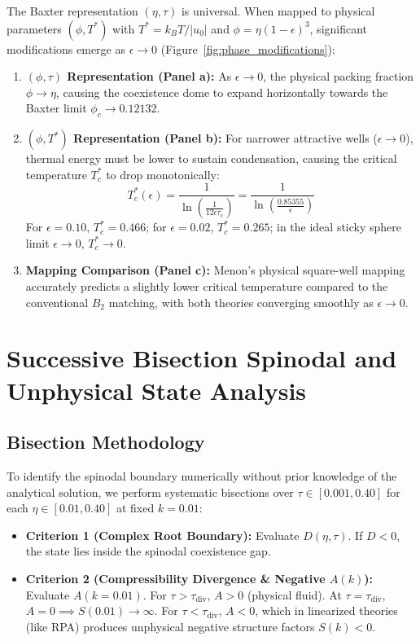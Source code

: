 \documentclass[11pt,a4paper]{article}
\begin{document}
The Baxter representation $(\eta, \tau)$ is universal. When mapped to physical parameters $(\phi, T^*)$ with $T^* = k_B T / |u_0|$ and $\phi = \eta (1-\epsilon)^3$, significant modifications emerge as $\epsilon \to 0$ (Figure~\ref{fig:phase_modifications}):
\begin{enumerate}
    \item \textbf{$(\phi, \tau)$ Representation (Panel a):} As $\epsilon \to 0$, the physical packing fraction $\phi \to \eta$, causing the coexistence dome to expand horizontally towards the Baxter limit $\phi_c \to 0.12132$.
    \item \textbf{$(\phi, T^*)$ Representation (Panel b):} For narrower attractive wells ($\epsilon \to 0$), thermal energy must be lower to sustain condensation, causing the critical temperature $T^*_c$ to drop monotonically:
    \begin{equation}
        T^*_c(\epsilon) = \frac{1}{\ln\left(\frac{1}{12\epsilon\tau_c}\right)} = \frac{1}{\ln\left(\frac{0.85355}{\epsilon}\right)}
    \end{equation}
    For $\epsilon = 0.10$, $T^*_c = 0.466$; for $\epsilon = 0.02$, $T^*_c = 0.265$; in the ideal sticky sphere limit $\epsilon \to 0$, $T^*_c \to 0$.
    \item \textbf{Mapping Comparison (Panel c):} Menon's physical square-well mapping accurately predicts a slightly lower critical temperature compared to the conventional $B_2$ matching, with both theories converging smoothly as $\epsilon \to 0$.
\end{enumerate}

\section{Successive Bisection Spinodal and Unphysical State Analysis}

\subsection{Bisection Methodology}
To identify the spinodal boundary numerically without prior knowledge of the analytical solution, we perform systematic bisections over $\tau \in [0.001, 0.40]$ for each $\eta \in [0.01, 0.40]$ at fixed $k = 0.01$:
\begin{itemize}
    \item \textbf{Criterion 1 (Complex Root Boundary):} Evaluate $D(\eta, \tau)$. If $D < 0$, the state lies inside the spinodal coexistence gap.
    \item \textbf{Criterion 2 (Compressibility Divergence \& Negative $A(k)$):} Evaluate $A(k=0.01)$. For $\tau > \tau_{\text{div}}$, $A > 0$ (physical fluid). At $\tau = \tau_{\text{div}}$, $A = 0 \implies S(0.01) \to \infty$. For $\tau < \tau_{\text{div}}$, $A < 0$, which in linearized theories (like RPA) produces unphysical negative structure factors $S(k) < 0$.
\end{itemize}
\end{document}
